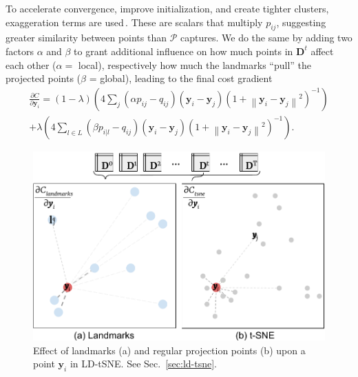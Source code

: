To accelerate convergence, improve initialization, and create tighter clusters, exaggeration terms are used\,\cite{vanderMaaten2008,vanderMaaten2015,Linderman2017,Linderman2017a}. These are scalars that multiply $p_{i j}$, suggesting greater similarity between points than $\mathcal P$ captures. We do the same by adding two factors $\alpha$ and $\beta$ to grant additional influence on how much points in $\mathbf{D}^t$ affect each other ($\alpha = $ local), respectively how much the landmarks ``pull'' the projected points ($\beta$ = global), leading to the final cost gradient
%
\begin{equation*}
 \begin{aligned}
  \frac{\partial C}{\partial \mathbf{y}_{i}} =(1-\lambda)\left(4 \sum_{j}\left(\alpha p_{i j}-q_{i j}\right)\left(\mathbf{y}_{i}-\mathbf{y}_{j}\right)\left(1+\left\|\mathbf{y}_{i}-\mathbf{y}_{j}\right\|^{2}\right)^{-1}\right) \\
  +\lambda\left(4 \sum_{l \in L}\left(\beta p_{i | l}-q_{i j}\right)\left(\mathbf{y}_{i}-\mathbf{y}_{j}\right)\left(1+\left\|\mathbf{y}_{i}-\mathbf{y}_{j}\right\|^{2}\right)^{-1}\right).
 \end{aligned}
\end{equation*}
%
%
\begin{figure}[h]\centering
  \includegraphics[width=\linewidth]{figures/projection-algorithm/ldtsne.pdf}
  \caption{Effect of landmarks (a) and regular projection points (b) upon a point $\mathbf{y}_i$ in LD-tSNE. See Sec.~\ref{sec:ld-tsne}.}
  \label{fig:ldtsne}
\end{figure}

